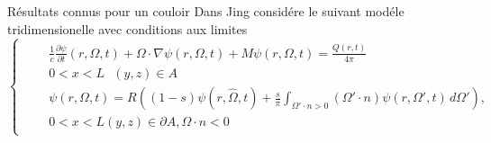 %
\begin{frame}{Résultats connus pour un couloir}
Dans \cite{Jin} Jing considére le suivant modéle tridimensionelle avec conditions aux limites 
\begin{equation}
\begin{cases}
\begin{split}
&& \frac{1}{c} \frac{\partial \psi}{\partial t} (r, \Omega,t) + \Omega \cdot \nabla \psi(r, \Omega,t) + M \psi (r, \Omega,t) = \frac{Q(r,t)}{4\pi}  \\
&&0< x< L \ \ \ (y,z) \in A \\
&& \psi(r, \Omega,t) = R \left( (1-s) \psi(r,\hat{\Omega},t) + \frac{s}{\pi} \int_{\Omega' \cdot n>0} (\Omega' \cdot n) \psi(r,\Omega',t) \, d\Omega' \right), \\
&&0<x<L (y,z) \in \partial A, \Omega\cdot n < 0
\end{split}
\end{cases}
\end{equation}
\end{frame}
%
